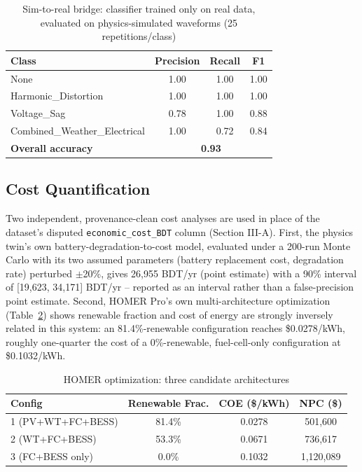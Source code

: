 \documentclass[conference]{IEEEtran}
\begin{document}
\begin{table}[t]
\centering
\caption{Sim-to-real bridge: classifier trained only on real data,
evaluated on physics-simulated waveforms (25 repetitions/class)}
\label{tab:bridge}
\begin{tabular}{lccc}
\toprule
Class & Precision & Recall & F1 \\
\midrule
None & 1.00 & 1.00 & 1.00 \\
Harmonic\_Distortion & 1.00 & 1.00 & 1.00 \\
Voltage\_Sag & 0.78 & 1.00 & 0.88 \\
Combined\_Weather\_Electrical & 1.00 & 0.72 & 0.84 \\
\midrule
\textbf{Overall accuracy} & \multicolumn{3}{c}{\textbf{0.93}} \\
\bottomrule
\end{tabular}
\end{table}

\subsection{Cost Quantification}
\label{sec:cost}
Two independent, provenance-clean cost analyses are used in place of
the dataset's disputed \texttt{economic\_cost\_BDT} column
(Section III-A). First, the physics twin's own
battery-degradation-to-cost model, evaluated under a 200-run Monte
Carlo with its two assumed parameters (battery replacement cost,
degradation rate) perturbed $\pm$20\%, gives 26,955 BDT/yr (point
estimate) with a 90\% interval of [19,623, 34,171] BDT/yr -- reported
as an interval rather than a false-precision point estimate. Second,
HOMER Pro's own multi-architecture optimization
(Table~\ref{tab:homer}) shows renewable fraction and cost of energy
are strongly inversely related in this system: an 81.4\%-renewable
configuration reaches \$0.0278/kWh, roughly one-quarter the cost of a
0\%-renewable, fuel-cell-only configuration at \$0.1032/kWh.

\begin{table}[t]
\centering
\caption{HOMER optimization: three candidate architectures}
\label{tab:homer}
\begin{tabular}{lccc}
\toprule
Config & Renewable Frac. & COE (\$/kWh) & NPC (\$) \\
\midrule
1 (PV+WT+FC+BESS) & 81.4\% & 0.0278 & 501,600 \\
2 (WT+FC+BESS)     & 53.3\% & 0.0671 & 736,617 \\
3 (FC+BESS only)   & 0.0\%  & 0.1032 & 1,120,089 \\
\bottomrule
\end{tabular}
\end{table}
\end{document}
